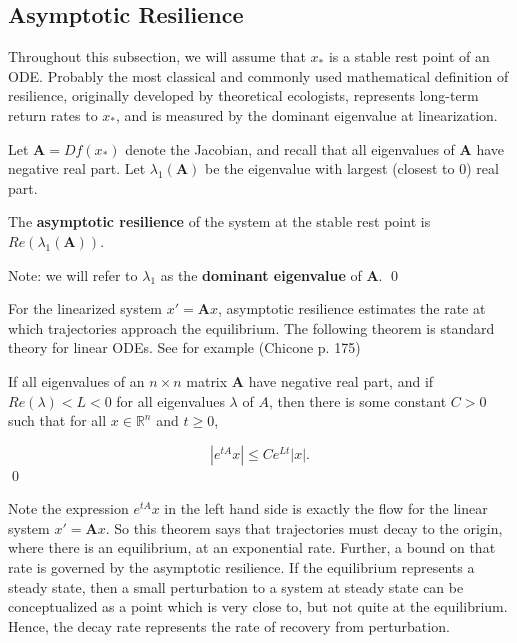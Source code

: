 \subsection{Asymptotic Resilience}

Throughout this subsection, we will assume that $x_\ast$ is a stable rest point of an ODE. Probably the most classical and commonly used mathematical definition of resilience, originally developed by theoretical ecologists, represents long-term return rates to $x_{\ast}$, and is measured by the dominant eigenvalue at linearization. 

\begin{definition}
	\label{def:asymp}
	 Let $\textbf{A} = Df(x_\ast)$ denote the Jacobian, and recall that all eigenvalues of $\mathbf{A}$ have negative real part. Let $\lambda_1(\textbf{A})$ be the eigenvalue with largest (closest to 0) real part. 
	
	\begin{center}
	The \textbf{asymptotic resilience} of the system at the stable rest point is $Re(\lambda_1(\textbf{A}))$.
	\end{center}
Note: we will refer to $\lambda_1$ as the \textbf{dominant eigenvalue} of $\mathbf{A}$. 
	 \qed 
\end{definition}

For the linearized system $x'= \textbf{A}x$, asymptotic resilience estimates the rate at which trajectories approach the equilibrium. The following theorem is standard theory for linear ODEs. See for example (Chicone p. 175) 

\begin{theorem}
	If all eigenvalues of an $n \times n$ matrix $\mathbf{A}$ have negative real part, and if $Re(\lambda) < L < 0$ for all eigenvalues $\lambda$ of $A$, then there is some constant $C>0$ such that for all $x \in \mathbb{R}^n$ and $t \geq 0$,
	
	$$|e^{tA}x| \leq Ce^{L t}|x|.$$  \qed
\end{theorem}

Note the expression $e^{tA}x$ in the left hand side is exactly the flow for the linear system $x' = \mathbf{A}x$. So this theorem says that trajectories must decay to the origin, where there is an equilibrium, at an exponential rate. Further, a bound on that rate is governed by the asymptotic resilience. If the equilibrium represents a steady state, then a small perturbation to a system at steady state can be conceptualized as a point which is very close to, but not quite at the equilibrium. Hence, the decay rate represents the rate of recovery from perturbation. 

